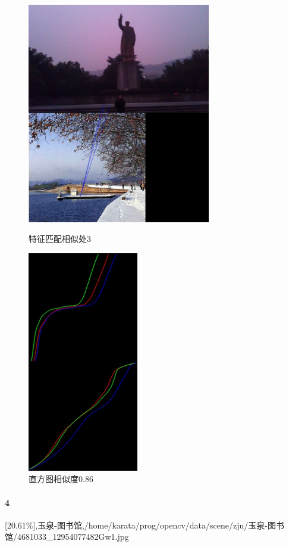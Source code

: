 \begin{figure}[htb]
\begin{minipage}[t]{0.5\linewidth}
\centering
\includegraphics[height=3.8in]{玉泉毛像.jpg.d/im3sift.jpg}
\caption{特征匹配相似处3}
\label{fig:side:a}
\end{minipage}%
\begin{minipage}[t]{0.5\linewidth}
\centering
\includegraphics[height=3.8in]{玉泉毛像.jpg.d/im3hist2.jpg}
\caption{直方图相似度0.86}
\label{fig:side:a}
\end{minipage}%
\end{figure}

\clearpage
\paragraph{4}
[20.61\%],玉泉-图书馆,/home/karata/prog/opencv/data/scene/zju/玉泉-图书馆/4681033_12954077482Gw1.jpg

